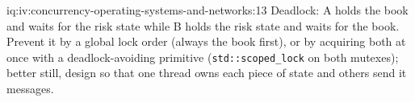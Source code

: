 \begin{solution}{iq:iv:concurrency-operating-systems-and-networks:13}
Deadlock: A holds the book and waits for the risk state while B holds the risk state and waits for the book. Prevent it by a global
lock order (always the book first), or by acquiring both at once with a deadlock-avoiding primitive (\texttt{std::scoped\_lock} on both
mutexes); better still, design so that one thread owns each piece of state and others send it messages.
\end{solution}

